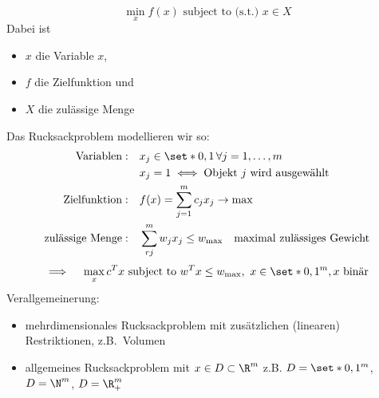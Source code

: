 \begin{definition} \label{def:allgemeines_optimierungsproblem}
  \begin{equation*}
    \min_{x} f(x) \text{ subject to (s.t.) } x \in X
  \end{equation*}
  Dabei ist
  \begin{itemize}
    \item $x$ die Variable $x$,
    \item $f$ die Zielfunktion und
    \item $X$ die zulässige Menge
  \end{itemize}
\end{definition}
Das Rucksackproblem modellieren wir so:
\begin{align*}
\text{Variablen}:\quad & x_{j} \in \set*{0,1}\, \forall j =1, \dots, m\\
				 & x_{j}=1 \iff \text{Objekt $j$ wird ausgewählt}\\
\text{Zielfunktion}:\quad& f(x)= \sum_{j=1}^{m} c_j x_{j}\rightarrow \max\\
\text{zulässige Menge}:\quad & \sum_{rj}^{m} w_j x_j \leq w_{\max}\quad \text{maximal zulässiges Gewicht}
\end{align*}
\begin{equation*}
	\implies \quad \max_{x}c^Tx \text{ subject to } w^Tx \leq w_{\max},\ x \in \set*{0,1}^m, x \text{ binär}
\end{equation*}
Verallgemeinerung:
\begin{itemize}
	\item mehrdimensionales Rucksackproblem mit zusätzlichen (linearen) Restriktionen, z.B.\ Volumen
  \item allgemeines Rucksackproblem mit $x\in D\subset \R^m$ z.B. $D=\set*{0,1}^m$, $D=\N^m$, $D = \R_{+}^m$
\end{itemize}

